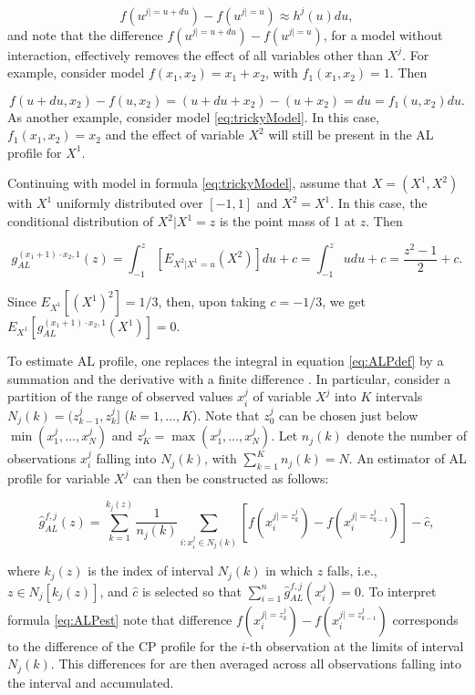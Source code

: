 \documentclass[]{krantz}
\begin{document}
\[
f(u^{j|=u+du})-f(u^{j|=u})  \approx h^j(u)du,
\]
and note that the difference \(f(u^{j|=u+du})-f(u^{j|=u})\), for a model without interaction, effectively removes the effect of all variables other than \(X^j\). For example, consider model \(f(x_1, x_2) = x_1 + x_2\), with \(f_1(x_1,x_2)=1\). Then

\[
f(u+du,x_2)-f(u,x_2)  = (u + du + x_2) - (u + x_2) = du = f_1(u,x_2) du.
\]
As another example, consider model \eqref{eq:trickyModel}. In this case, \(f_1(x_1,x_2)=x_2\) and the effect of variable \(X^2\) will still be present in the AL profile for \(X^1\).

Continuing with model in formula \eqref{eq:trickyModel}, assume that \(X=(X^1,X^2)\) with \(X^1\) uniformly distributed over \([-1,1]\) and \(X^2=X^1\). In this case, the conditional distribution of \(X^2 | X^1=z\) is the point mass of 1 at \(z\). Then

\begin{equation}
g_{AL}^{(x_1+1)\cdot x_2,1}(z) = \int_{-1}^z \left[E_{X^2|X^1=u}\left( X^2 \right)\right] du + c = \int_{-1}^z u du + c = \frac{z^2-1}{2}+c.
\label{eq:ALtrickyModel}
\end{equation}

Since \(E_{X^1}\left[(X^1)^2\right] = 1/3\), then, upon taking \(c=-1/3\), we get \(E_{X^1}\left[g_{AL}^{(x_1+1) \cdot x_2,1}(X^1)\right] = 0\).

To estimate AL profile, one replaces the integral in equation \eqref{eq:ALPdef} by a summation and the derivative with a finite difference \citep{ALEPlotRPackage}. In particular, consider a partition of the range of observed values \(x_{i}^j\) of variable \(X^j\) into \(K\) intervals \(N_j(k)=(z_{k-1}^j,z_k^j]\) (\(k=1,\ldots,K\)). Note that \(z_0^j\) can be chosen just below \(\min(x_1^j,\ldots,x_N^j)\) and \(z_K^j=\max(x_1^j,\ldots,x_N^j)\). Let \(n_j(k)\) denote the number of observations \(x_i^j\) falling into \(N_j(k)\), with \(\sum_{k=1}^K n_j(k)=N\). An estimator of AL profile for variable \(X^j\) can then be constructed as follows:

\begin{equation}
\widehat{g}_{AL}^{f,j}(z) = \sum_{k=1}^{k_j(z)} \frac{1}{n_j(k)} \sum_{i: x_i^j \in N_j(k)} \left[ f(x_i^{j| = z_k^j}) - f(x_i^{j| = z_{k-1}^j}) \right] - \hat{c},
\label{eq:ALPest}
\end{equation}

where \(k_j(z)\) is the index of interval \(N_j(k)\) in which \(z\) falls, i.e., \(z \in N_j[k_j(z)]\), and \(\hat{c}\) is selected so that \(\sum_{i=1}^n \widehat{g}_{AL}^{f,j}(x_i^j)=0\). To interpret formula \eqref{eq:ALPest} note that difference \(f\left(x_i^{j| = z_k^j}\right) - f\left(x_i^{j| = z_{k-1}^j}\right)\) corresponds to the difference of the CP profile for the \(i\)-th observation at the limits of interval \(N_j(k)\). This differences for are then averaged across all observations falling into the interval and accumulated.
\end{document}

